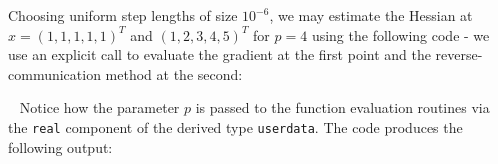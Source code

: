 \documentclass{galahad}
\begin{document}
Choosing uniform  step lengths of size $10^{-6}$, we may estimate the
Hessian at $x = (1,1,1,1,1)^T$ and $(1,2,3,4,5)^T$ for $p = 4$ using the
following code - we use an explicit call to evaluate the gradient
at the first point and the reverse-communication method at the second:

{\tt \small
\VerbatimInput{\packageexample}
}
\noindent
Notice how the parameter $p$ is passed to the function evaluation
routines via the {\tt real} component of the derived type {\tt userdata}.
The code produces the following output:
{\tt \small
\VerbatimInput{\packageresults}
}
\noindent
\end{document}
